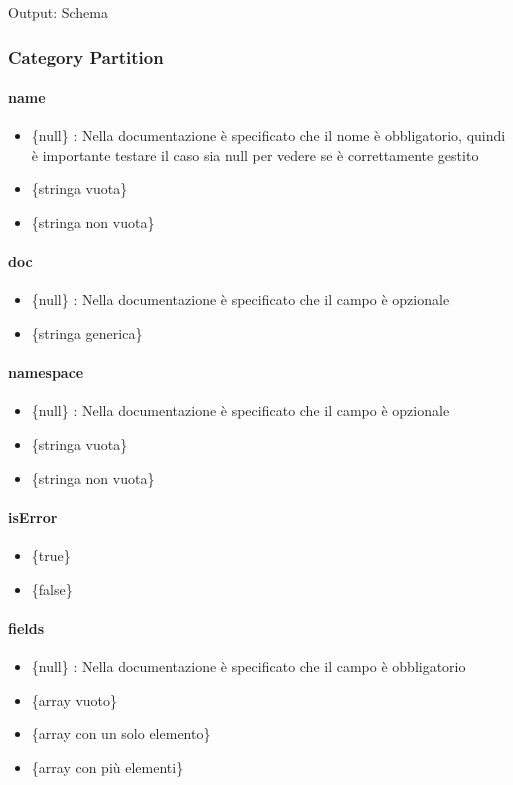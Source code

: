 \documentclass[12pt, a4paper]{article}
\begin{document}
Output: Schema

\subsubsection{Category Partition}

\paragraph{name}
\begin{itemize}
  \item \{null\} : Nella documentazione è specificato che il nome è obbligatorio, quindi è importante testare il caso sia null per vedere se è correttamente gestito
  \item \{stringa vuota\}
  \item \{stringa non vuota\}
\end{itemize}

\paragraph{doc}
\begin{itemize}
  \item \{null\} : Nella documentazione è specificato che il campo è opzionale
  \item \{stringa generica\}
\end{itemize}

\paragraph{namespace}
\begin{itemize}
  \item \{null\} : Nella documentazione è specificato che il campo è opzionale
  \item \{stringa vuota\}
  \item \{stringa non vuota\}
\end{itemize}

\paragraph{isError}
\begin{itemize}
  \item \{true\}
  \item \{false\}
\end{itemize}

\paragraph{fields}
\begin{itemize}
  \item \{null\} : Nella documentazione è specificato che il campo è obbligatorio
  \item \{array vuoto\}
  \item \{array con un solo elemento\}
  \item \{array con più elementi\}
\end{itemize}
\end{document}
